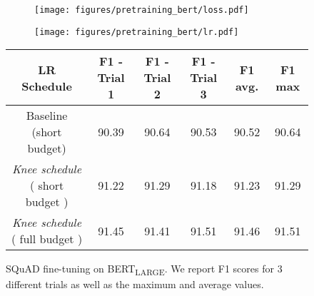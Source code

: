 \documentclass[twoside,11pt]{article}
\newcommand{\lrschedule}{\textit{Knee schedule}}
\begin{document}
\begin{figure}[ht]
\begin{minipage}{\textwidth}
  \begin{subfigure}[t]{\textwidth}
        \centering
        \texttt{[image: figures/pretraining\_bert/loss.pdf]}
\label{fig:bert_tr_loss}
    \end{subfigure}
    \begin{subfigure}[t]{\textwidth}
        \centering
        \texttt{[image: figures/pretraining\_bert/lr.pdf]}
\label{fig:bert_lr}
    \end{subfigure}
\caption{BERT\textsubscript{LARGE} pretraining for batch size of 16k with LAMB optimizer for the short budget runs. Shown are the training loss and learning rate as a function of steps, for the baseline scheme short budget (orange) vs the \lrschedule{} scheme short budget (blue). The plot is split into 2 parts to give a clear picture of the two phases of training~\cite{devlin2018bert}. Note that even though the training loss curves look similar for the two runs, we see a significant gap in F1 score obtained when we fine-tune the model checkpoints on SQuAD-v1.1 \cite{rajpurkar2016squad}. See Table~\ref{tab:bert-large_finetuning} for details.
}
\label{fig:bert_plots}
\end{minipage}
\begin{minipage}{\textwidth}
\small
\centering
\vspace{25pt}
\begin{tabular}{cccccc}
  \toprule
  LR Schedule & F1 - Trial 1   & F1 - Trial 2 & F1 - Trial 3 & F1 avg. & F1 max \\
  \midrule
    Baseline (short budget)  & 90.39 & 90.64 & 90.53 & 90.52 & 90.64\\
  \lrschedule{}{} ( short budget ) & 91.22  & 91.29 & 91.18 & 91.23 & 91.29\\
  \lrschedule{}{} ( full budget ) & 91.45  & 91.41 & 91.51 & 91.46 & 91.51\\
  
  \bottomrule
\end{tabular}
\captionsetup{type=table}
\caption{SQuAD fine-tuning on BERT\textsubscript{LARGE}. We report F1 scores for 3 different trials as well as the maximum and average values.}
\label{tab:bert-large_finetuning}
\end{minipage}
\end{figure}
\end{document}

